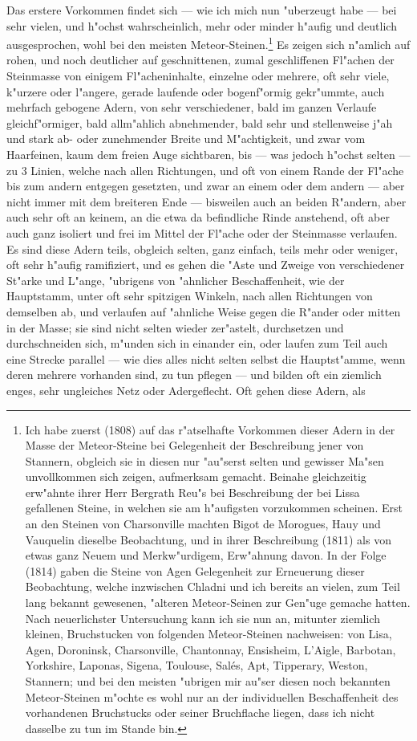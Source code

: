 \documentclass[a4paper, 11pt, oneside, german]{article}
\begin{document}
Das erstere Vorkommen findet sich --- wie ich mich nun "uberzeugt habe --- bei sehr vielen, und h"ochst wahrscheinlich, mehr oder minder h"aufig und deutlich ausgesprochen, wohl bei den meisten Meteor-Steinen.\footnote{Ich habe zuerst (1808) auf das r"atselhafte Vorkommen dieser Adern in der Masse der Meteor-Steine bei Gelegenheit der Beschreibung jener von Stannern, obgleich sie in diesen nur "au"serst selten und gewisser Ma"sen unvollkommen sich zeigen, aufmerksam gemacht. Beinahe gleichzeitig erw"ahnte ihrer Herr Bergrath Reu"s bei Beschreibung der bei Lissa gefallenen Steine, in welchen sie am h"aufigsten vorzukommen scheinen. Erst an den Steinen von Charsonville machten Bigot de Morogues, Hauy und Vauquelin dieselbe Beobachtung, und in ihrer Beschreibung (1811) als von etwas ganz Neuem und Merkw"urdigem, Erw"ahnung davon. In der Folge (1814) gaben die Steine von Agen Gelegenheit zur Erneuerung dieser Beobachtung, welche inzwischen Chladni und ich bereits an vielen, zum Teil lang bekannt gewesenen, "alteren Meteor-Seinen zur Gen"uge gemache hatten. Nach neuerlichster Untersuchung kann ich sie nun an, mitunter ziemlich kleinen, Bruchstucken von folgenden Meteor-Steinen nachweisen: von Lisa, Agen, Doroninsk, Charsonville, Chantonnay, Ensisheim, L'Aigle, Barbotan, Yorkshire, Laponas, Sigena, Toulouse, Salés, Apt, Tipperary, Weston, Stannern; und bei den meisten "ubrigen mir au"ser diesen noch bekannten Meteor-Steinen m"ochte es wohl nur an der individuellen Beschaffenheit des vorhandenen Bruchstucks oder seiner Bruchflache liegen, dass ich nicht dasselbe zu tun im Stande bin.} Es zeigen sich n"amlich auf rohen, und noch deutlicher auf geschnittenen, zumal geschliffenen Fl"achen der Steinmasse von einigem Fl"acheninhalte, einzelne oder mehrere, oft sehr viele, k"urzere oder l"angere, gerade laufende oder bogenf"ormig gekr"ummte, auch mehrfach gebogene Adern, von sehr verschiedener, bald im ganzen Verlaufe gleichf"ormiger, bald allm"ahlich abnehmender, bald sehr und stellenweise j"ah und stark ab- oder zunehmender Breite und M"achtigkeit, und zwar vom Haarfeinen, kaum dem freien Auge sichtbaren, bis --- was jedoch h"ochst selten --- zu 3 Linien, welche nach allen Richtungen, und oft von einem Rande der Fl"ache bis zum andern entgegen gesetzten, und zwar an einem oder dem andern --- aber nicht immer mit dem breiteren Ende --- bisweilen auch an beiden R"andern, aber auch sehr oft an keinem, an die etwa da befindliche Rinde anstehend, oft aber auch ganz isoliert und frei im Mittel der Fl"ache oder der Steinmasse verlaufen. Es sind diese Adern teils, obgleich selten, ganz einfach, teils mehr oder weniger, oft sehr h"aufig ramifiziert, und es gehen die "Aste und Zweige von verschiedener St"arke und L"ange, "ubrigens von "ahnlicher Beschaffenheit, wie der Hauptstamm, unter oft sehr spitzigen Winkeln, nach allen Richtungen von demselben ab, und verlaufen auf "ahnliche Weise gegen die R"ander oder mitten in der Masse; sie sind nicht selten wieder zer"astelt, durchsetzen und durchschneiden sich, m"unden sich in einander ein, oder laufen zum Teil auch eine Strecke parallel --- wie dies alles nicht selten selbst die Hauptst"amme, wenn deren mehrere vorhanden sind, zu tun pflegen --- und bilden oft ein ziemlich enges, sehr ungleiches Netz oder Adergeflecht. Oft gehen diese Adern, als 
\end{document}
